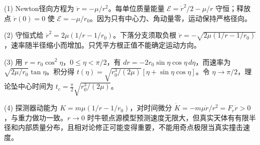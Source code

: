 (1) Newton径向方程为 \(\ddot r=-\mu/r^2\)。每单位质量能量 \(\mathcal E=\dot r^2/2-\mu/r\) 守恒；释放点 \(\dot r(0)=0\) 使 \(\mathcal E=-\mu/r_0\)。因为只有中心力、角动量零，运动保持严格径向。

(2) 守恒式给 \(\dot r^2=2\mu(1/r-1/r_0)\)。下落分支须取负根 \(\boxed{\dot r=-\sqrt{2\mu(1/r-1/r_0)}}\)，速率随半径缩小而增加。只凭平方根正值不能确定运动方向。

(3) 用 \(r=r_0\cos^2\eta\)，\(0\le\eta<\pi/2\)，有 \(dr=-2r_0\sin\eta\cos\eta\,d\eta\)，而速率为 \(\sqrt{2\mu/r_0}\tan\eta\)。积分得 \(\boxed{t(\eta)=\sqrt{r_0^3/(2\mu)}[\eta+\sin\eta\cos\eta]}\)。令 \(\eta\to\pi/2\)，理论坠中心时间为 \(\boxed{t_c=\frac\pi2\sqrt{r_0^3/(2\mu)}}\)。

(4) 探测器动能为 \(K=m\mu(1/r-1/r_0)\)，对时间微分 \(\dot K=-m\mu\dot r/r^2=F_r\dot r>0\)，与重力做功一致。\(r\to0\) 时牛顿点源模型预测速度无限大，但真实天体有有限半径和内部质量分布，且相对论修正可能变得重要，不能用奇点极限当真实撞击速度。
